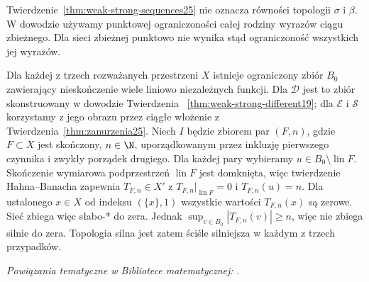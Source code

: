 \begin{uwaga}
\label{rem:sequence-net25}
Twierdzenie~\ref{thm:weak-strong-sequences25} nie oznacza
równości topologii $\sigma$ i $\beta$.
W dowodzie używamy punktowej ograniczoności całej
rodziny wyrazów ciągu zbieżnego. Dla sieci zbieżnej
punktowo nie wynika stąd ograniczoność wszystkich
jej wyrazów.

Dla każdej z trzech rozważanych przestrzeni $X$
istnieje ograniczony zbiór $B_0$ zawierający nieskończenie
wiele liniowo niezależnych funkcji. Dla $\mathcal D$
jest to zbiór skonstruowany w dowodzie Twierdzenia~
\ref{thm:weak-strong-different19}; dla $\mathcal E$
i $\mathcal S$ korzystamy z jego obrazu przez ciągłe
włożenie z Twierdzenia~\ref{thm:zanurzenia25}.
Niech $I$ będzie zbiorem par $(F,n)$, gdzie
$F\subset X$ jest skończony, $n\in\N$, uporządkowanym
przez inkluzję pierwszego czynnika i zwykły porządek
drugiego. Dla każdej pary wybieramy
$u\in B_0\setminus\operatorname{lin}F$.
Skończenie wymiarowa podprzestrzeń $\operatorname{lin}F$
jest domknięta, więc twierdzenie Hahna--Banacha
zapewnia $T_{F,n}\in X'$ z
$T_{F,n}|_{\operatorname{lin}F}=0$ i $T_{F,n}(u)=n$.
Dla ustalonego $x\in X$ od indeksu $(\{x\},1)$
wszystkie wartości $T_{F,n}(x)$ są zerowe.
Sieć zbiega więc słabo-* do zera. Jednak
$\sup_{v\in B_0}|T_{F,n}(v)|\ge n$, więc
nie zbiega silnie do zera. Topologia silna
jest zatem ściśle silniejsza w każdym z trzech przypadków.
\end{uwaga}

\noindent\emph{Powiązania tematyczne w Bibliotece matematycznej:} .
